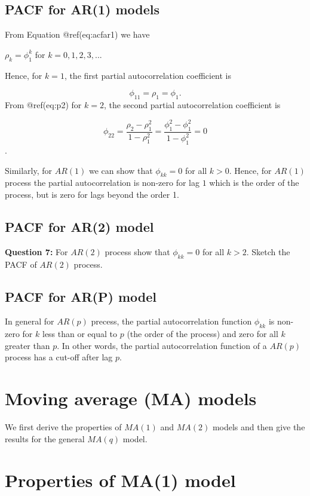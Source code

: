 \documentclass[
  11pt,
  a4paper,
]{report}
\begin{document}
\subsection{PACF for AR(1) models}\label{pacf-for-ar1-models}

From Equation @ref(eq:acfar1) we have

\(\rho_k=\phi_1^k\) for \(k=0, 1, 2, 3,...\)

Hence, for \(k=1\), the first partial autocorrelation coefficient is

\[\phi_{11}=\rho_1=\phi_1.\] From @ref(eq:p2) for \(k=2\), the second
partial autocorrelation coefficient is

\[\phi_{22}=\frac{\rho_2-\rho_1^2}{1-\rho_1^2}=\frac{\phi_1^2-\phi_1^2}{1-\phi_1^2} = 0\].

Similarly, for \(AR(1)\) we can show that \(\phi_{kk}=0\) for all
\(k > 0\). Hence, for \(AR(1)\) process the partial autocorrelation is
non-zero for lag \(1\) which is the order of the process, but is zero
for lags beyond the order 1.

\subsection{PACF for AR(2) model}\label{pacf-for-ar2-model}

\textbf{Question 7:} For \(AR(2)\) process show that \(\phi_{kk}=0\) for
all \(k>2\). Sketch the PACF of \(AR(2)\) process.

\subsection{PACF for AR(P) model}\label{pacf-for-arp-model}

In general for \(AR(p)\) precess, the partial autocorrelation function
\(\phi_{kk}\) is non-zero for \(k\) less than or equal to \(p\) (the
order of the process) and zero for all \(k\) greater than \(p\). In
other words, the partial autocorrelation function of a \(AR(p)\) process
has a cut-off after lag \(p\).

\section{Moving average (MA) models}\label{moving-average-ma-models}

We first derive the properties of \(MA(1)\) and \(MA(2)\) models and
then give the results for the general \(MA(q)\) model.

\section{Properties of MA(1) model}\label{properties-of-ma1-model}
\end{document}

